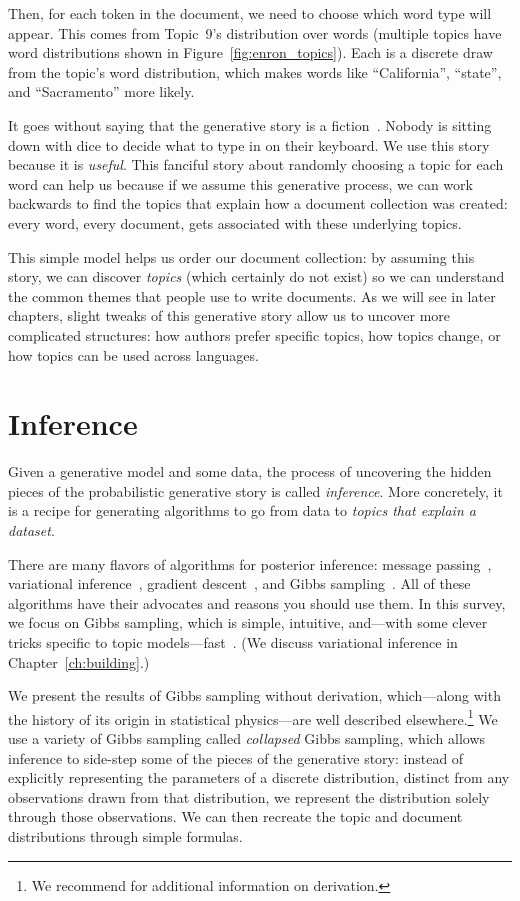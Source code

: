 Then, for each token in the document, we need to choose which word type will appear.  This
comes from Topic~9's distribution over words (multiple topics have
word distributions shown in Figure~\ref{fig:enron_topics}).  Each is a
discrete draw from the topic's word distribution, which makes words
like ``California'', ``state'', and ``Sacramento'' more likely.

It goes without saying that the generative story is a fiction~\citep{box-87}.
Nobody is sitting down with dice to decide what to type in on their keyboard.
We use this story because it is \emph{useful}.  This fanciful story about randomly
choosing a topic for each word can help us because if we assume this generative
process, we can work backwards to find the topics that explain how a document
collection was created: every word, every document, gets associated with these
underlying topics.

This simple model helps us order our document collection: by assuming
this story, we can discover \emph{topics} (which certainly do not
exist) so we can understand the common themes that people use to write
documents.  As we will see in later chapters, slight tweaks of this
generative story allow us to uncover more complicated structures: how
authors prefer specific topics, how topics change, or how topics can
be used across languages.

\section{Inference}

Given a generative model and some data, the process of uncovering the hidden
 pieces of the probabilistic generative story is called \emph{inference}.  More
concretely, it is a recipe for generating algorithms to go from data to
\emph{topics that explain a dataset}.

There are many flavors of algorithms for posterior inference: message
passing~\citep{zeng-13}, variational inference~\citep{blei-03},
gradient descent~\citep{hoffman-10}, and Gibbs
sampling~\citep{griffiths-04}.  All of these algorithms have their
advocates and reasons you should use them.  In this survey, we focus
on Gibbs sampling, which is simple, intuitive, and---with some clever
tricks specific to topic models---fast~\citep{yao-09}.  (We discuss
variational inference in Chapter~\ref{ch:building}.)

We present the results of Gibbs sampling without derivation,
which---along with the history of its origin in statistical
physics---are well described elsewhere.\footnote{We recommend
  \citet{resnik-09} for additional information on derivation.} We use
a variety of Gibbs sampling called \emph{collapsed} Gibbs sampling,
which allows inference to side-step some of the pieces of the
generative story: instead of explicitly representing the parameters of
a discrete distribution, distinct from any observations drawn from
that distribution, we represent the distribution solely through those
observations.  We can then recreate the topic and document
distributions through simple formulas.

